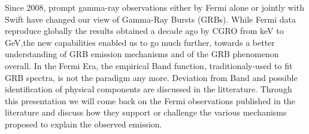 


\bigskip



\bigskip

\noindent Since 2008, prompt gamma-ray observations either by Fermi alone or jointly with Swift have changed our view of Gamma-Ray Bursts (GRBs). While Fermi data reproduce globally the results obtained a decade ago by CGRO from keV to GeV,the new capabilities enabled us to go much further, towards a better understanding of GRB emission mechanisms and of the GRB phenomenon overall.
In the Fermi Era, the empirical Band function, traditionaly-used to fit GRB spectra, is not the paradigm any more. Deviation from Band and possible identification of physical components are discussed in the litterature.
Through this presentation we will come back on the Fermi observations published in the literature and discuss how they support or challenge the various mechanisms proposed to explain the observed emission.

